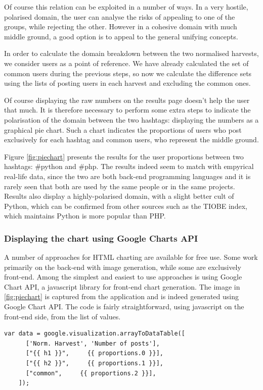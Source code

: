 \documentclass[12pt,a4paper,twoside]{report}
\begin{document}
Of course this relation can be exploited in a number of ways. In a very hostile, polarised domain, the user can analyse the risks of appealing to one of the groups, while rejecting the other. However in a cohesive domain with much middle ground, a good option is to appeal to the general unifying concepts.

In order to calculate the domain breakdown between the two normalised harvests, we consider users as a point of reference. We have already calculated the set of common users during the previous steps, so now we calculate the difference sets using the lists of posting users in each harvest and excluding the common ones.

Of course displaying the raw numbers on the results page doesn't help the user that much. It is therefore necessary to perform some extra steps to indicate the polarisation of the domain between the two hashtags: displaying the numbers as a graphical pie chart. Such a chart indicates the proportions of users who post exclusively for each hashtag and common users, who represent the middle ground.

Figure \ref{fig:piechart} presents the results for the user proportions between two hashtags: \#python and \#php. The results indeed seem to match with empyrical real-life data, since the two are both back-end programming languages and it is rarely seen that both are used by the same people or in the same projects. Results also display a highly-polarised domain, with a slight better cult of Python, which can be confirmed from other sources such as the TIOBE index, which maintains Python is more popular than PHP.

\subsubsection{Displaying the chart using Google Charts API}
A number of approaches for HTML charting are available for free use. Some work primarily on the back-end with image generation, while some are exclusively front-end. Among the simplest and easiest to use approaches is using Google Chart API, a javascript library for front-end chart generation. The image in \ref{fig:piechart} is captured from the application and is indeed generated using Google Chart API. The code is fairly straightforward, using javascript on the front-end side, from the list of values.

\begin{lstlisting}
var data = google.visualization.arrayToDataTable([
      ['Norm. Harvest', 'Number of posts'],
      ["{{ h1 }}",     {{ proportions.0 }}],
      ["{{ h2 }}",     {{ proportions.1 }}],
      ["common",     {{ proportions.2 }}],
    ]);
\end{lstlisting}
\end{document}
